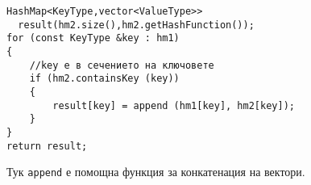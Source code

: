 \documentclass[12pt,a4paper]{article}
\begin{document}
\begin{enumerate}
\begin{mdframed}[hidealllines=true,backgroundcolor=gray!20]
\begin{verbatim}
HashMap<KeyType,vector<ValueType>> 
  result(hm2.size(),hm2.getHashFunction());
for (const KeyType &key : hm1)
{
    //key е в сечението на ключовете
    if (hm2.containsKey (key))
    {
        result[key] = append (hm1[key], hm2[key]);
    }
}
return result;

\end{verbatim}

    Тук \texttt{append} е помощна функция за конкатенация на вектори.




	\end{mdframed}




\end{enumerate}
\end{document}
